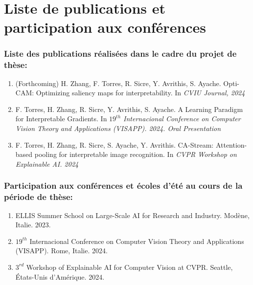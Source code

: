 \newpage
\chapter*{Liste de publications et participation aux conférences}
\subsection*{Liste des publications réalisées dans le cadre du projet de thèse:}
\begin{enumerate}
    \item (Forthcoming) H. Zhang, F. Torres, R. Sicre, Y. Avrithis, S. Ayache. Opti-CAM: 
    Optimizing saliency maps for interpretability. In \emph{CVIU Journal, 2024}
    \item F. Torres, H. Zhang, R. Sicre, Y. Avrithis, S. Ayache. A Learning Paradigm for 
    Interpretable Gradients. In \emph{$19^{th}$ Internacional Conference on Computer Vision 
    Theory and Applications (VISAPP). 2024. Oral Presentation}
    \item F. Torres, H. Zhang, R. Sicre, S. Ayache, Y. Avrithis. CA-Stream: 
    Attention-based pooling for interpretable image recognition. In \emph{CVPR Workshop 
    on Explainable AI. 2024}
\end{enumerate}


\subsection*{Participation aux conférences et écoles d’été au cours de la période de thèse:}
\begin{enumerate}
\item ELLIS Summer School on Large-Scale AI for Research and Industry. Modène, Italie. 2023.
\item $19^{th}$ Internacional Conference on Computer Vision Theory and Applications (VISAPP). Rome, Italie. 2024.
\item $3^{rd}$ Workshop of Explainable AI for Computer Vision at CVPR. Seattle, États-Unis d'Amérique. 2024.
\end{enumerate}
